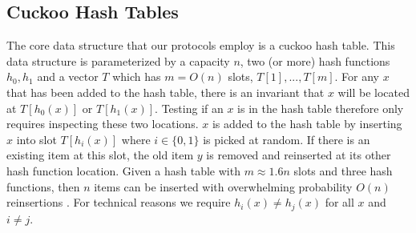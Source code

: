 \subsection{Cuckoo Hash Tables}

The core data structure that our protocols employ is a cuckoo hash table. This data structure is parameterized by a capacity $n$, two (or more) hash functions $h_0, h_1$ and a vector $T$ which has $m=O(n)$ slots, $T[1], ..., T[m]$. For any $x$ that has been added to the hash table, there is an invariant that $x$ will be located at $T[{h_0(x)}]$ or $T[{h_1(x)}]$. Testing if an $x$ is in the hash table therefore only requires inspecting these two locations. $x$ is added to the hash table by inserting $x$ into slot $T[h_i(x)]$ where $i\in \{0,1\}$ is picked at random. If there is an existing item at this slot, the old item $y$ is removed and reinserted at its other hash function location. Given a hash table with $m\approx1.6n$ slots and three hash functions, then $n$ items can be inserted with overwhelming probability $O(n)$ reinsertions \cite{DRRT18}. For technical reasons we require $h_i(x)\neq h_j(x)$ for all $x$ and $i\neq j$.